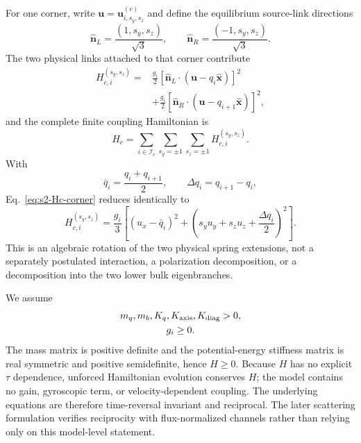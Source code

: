 \documentclass[10pt,aps,pre,reprint,floatfix,notitlepage,nofootinbib]{revtex4-2}
\newcommand{\vu}{\bm{u}}
\newcommand{\ex}{\hat{\bm{x}}}
\newcommand{\Ic}{\mathcal I_c}
\begin{document}
For one corner, write $\vu=\vu_{i,s_y,s_z}^{(c)}$ and define the equilibrium source-link directions
\begin{equation}
  \hat{\bm n}_L=\frac{(1,s_y,s_z)}{\sqrt3},
  \qquad
  \hat{\bm n}_R=\frac{(-1,s_y,s_z)}{\sqrt3}.
  \label{eq:s2-source-directions}
\end{equation}
The two physical links attached to that corner contribute
\begin{align}
  H_{c,i}^{(s_y,s_z)}
  ={}&\frac{g_i}{2}
  \left[
  \hat{\bm n}_L\cdot(\vu-q_i\ex)
  \right]^2
  \nonumber\\
  &+\frac{g_i}{2}
  \left[
  \hat{\bm n}_R\cdot(\vu-q_{i+1}\ex)
  \right]^2,
  \label{eq:s2-Hc-corner}
\end{align}
and the complete finite coupling Hamiltonian is
\begin{equation}
  H_c
  =\sum_{i\in\Ic}
   \sum_{s_y=\pm1}
   \sum_{s_z=\pm1}
   H_{c,i}^{(s_y,s_z)}.
  \label{eq:s2-Hc-total}
\end{equation}
With
\begin{equation}
  \bar q_i=\frac{q_i+q_{i+1}}{2},
  \qquad
  \Delta q_i=q_{i+1}-q_i,
  \label{eq:s2-qbar-delta}
\end{equation}
Eq.~\eqref{eq:s2-Hc-corner} reduces identically to
\begin{equation}
  H_{c,i}^{(s_y,s_z)}
  =\frac{g_i}{3}
  \left[
  (u_x-\bar q_i)^2
  +\left(
  s_yu_y+s_zu_z+\frac{\Delta q_i}{2}
  \right)^2
  \right].
  \label{eq:s2-Hc-reduced}
\end{equation}
This is an algebraic rotation of the two physical spring extensions, not a separately postulated interaction, a polarization decomposition, or a decomposition into the two lower bulk eigenbranches.

We assume
\begin{equation}
\begin{gathered}
  m_q,m_b,K_q,K_{\rm axis},K_{\rm diag}>0,\\
  g_i\ge0.
\end{gathered}
\label{eq:s2-positivity}
\end{equation}
The mass matrix is positive definite and the potential-energy stiffness matrix is real symmetric and positive semidefinite, hence $H\ge0$. Because $H$ has no explicit $\tau$ dependence, unforced Hamiltonian evolution conserves $H$; the model contains no gain, gyroscopic term, or velocity-dependent coupling. The underlying equations are therefore time-reversal invariant and reciprocal. The later scattering formulation verifies reciprocity with flux-normalized channels rather than relying only on this model-level statement.
\end{document}
